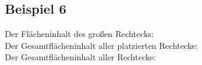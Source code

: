 \subsection{Beispiel 6}\label{ex:6}
Der Flächeninhalt des großen Rechtecks: \\
Der Gesamtflächeninhalt aller platzierten Rechtecke: \\
Der Gesamtflächeninhalt aller Rechtecke: 